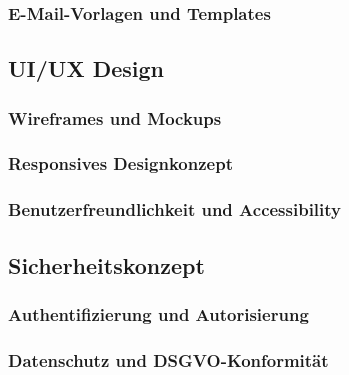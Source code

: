 \documentclass[11pt,a4paper]{article}
\begin{document}
\subsubsection{E-Mail-Vorlagen und Templates}

\subsection{UI/UX Design}

\subsubsection{Wireframes und Mockups}

\subsubsection{Responsives Designkonzept}

\subsubsection{Benutzerfreundlichkeit und Accessibility}

\subsection{Sicherheitskonzept}

\subsubsection{Authentifizierung und Autorisierung}

\subsubsection{Datenschutz und DSGVO-Konformität}
\end{document}
